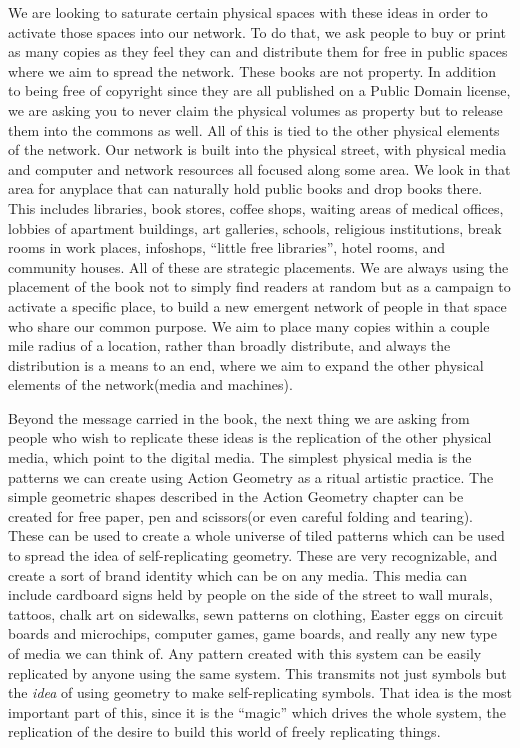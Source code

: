 We are looking to saturate certain physical spaces with these ideas in
order to activate those spaces into our network. To do that, we ask
people to buy or print as many copies as they feel they can and
distribute them for free in public spaces where we aim to spread the
network. These books are not property. In addition to being free of
copyright since they are all published on a Public Domain license, we
are asking you to never claim the physical volumes as property but to
release them into the commons as well. All of this is tied to the other
physical elements of the network. Our network is built into the physical
street, with physical media and computer and network resources all
focused along some area. We look in that area for anyplace that can
naturally hold public books and drop books there. This includes
libraries, book stores, coffee shops, waiting areas of medical offices,
lobbies of apartment buildings, art galleries, schools, religious
institutions, break rooms in work places, infoshops, ``little free
libraries'', hotel rooms, and community houses. All of these are
strategic placements. We are always using the placement of the book not
to simply find readers at random but as a campaign to activate a
specific place, to build a new emergent network of people in that space
who share our common purpose. We aim to place many copies within a
couple mile radius of a location, rather than broadly distribute, and
always the distribution is a means to an end, where we aim to expand the
other physical elements of the network(media and machines).

Beyond the message carried in the book, the next thing we are asking
from people who wish to replicate these ideas is the replication of the
other physical media, which point to the digital media. The simplest
physical media is the patterns we can create using Action Geometry as a
ritual artistic practice. The simple geometric shapes described in the
Action Geometry chapter can be created for free paper, pen and
scissors(or even careful folding and tearing). These can be used to
create a whole universe of tiled patterns which can be used to spread
the idea of self-replicating geometry. These are very recognizable, and
create a sort of brand identity which can be on any media. This media
can include cardboard signs held by people on the side of the street to
wall murals, tattoos, chalk art on sidewalks, sewn patterns on clothing,
Easter eggs on circuit boards and microchips, computer games, game
boards, and really any new type of media we can think of. Any pattern
created with this system can be easily replicated by anyone using the
same system. This transmits not just symbols but the \emph{idea} of
using geometry to make self-replicating symbols. That idea is the most
important part of this, since it is the ``magic'' which drives the whole
system, the replication of the desire to build this world of freely
replicating things.

